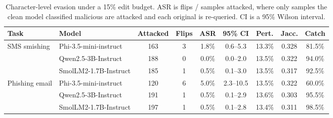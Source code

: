 \begin{table}[t]
\centering
\small
\caption{Character-level evasion under a 15\% edit budget. ASR is flips / samples attacked, where only samples the clean model classified malicious are attacked and each original is re-queried. CI is a 95\% Wilson interval.}
\label{tab:asr-char}
\begin{tabular}{llccccccc}
\toprule
\textbf{Task} & \textbf{Model} & \textbf{Attacked} & \textbf{Flips} & \textbf{ASR} & \textbf{95\% CI} & \textbf{Pert.} & \textbf{Jacc.} & \textbf{Catch} \\
\midrule
 SMS smishing & Phi-3.5-mini-instruct & 163 & 3 & 1.8\% & 0.6--5.3 & 13.3\% & 0.328 & 81.5\% \\
  & Qwen2.5-3B-Instruct & 188 & 0 & 0.0\% & 0.0--2.0 & 13.5\% & 0.322 & 94.0\% \\
  & SmolLM2-1.7B-Instruct & 185 & 1 & 0.5\% & 0.1--3.0 & 13.5\% & 0.317 & 92.5\% \\
\midrule
 Phishing email & Phi-3.5-mini-instruct & 120 & 6 & 5.0\% & 2.3--10.5 & 13.5\% & 0.322 & 60.0\% \\
  & Qwen2.5-3B-Instruct & 191 & 1 & 0.5\% & 0.1--2.9 & 13.6\% & 0.303 & 95.5\% \\
  & SmolLM2-1.7B-Instruct & 197 & 1 & 0.5\% & 0.1--2.8 & 13.4\% & 0.311 & 98.5\% \\
\bottomrule
\end{tabular}
\end{table}
